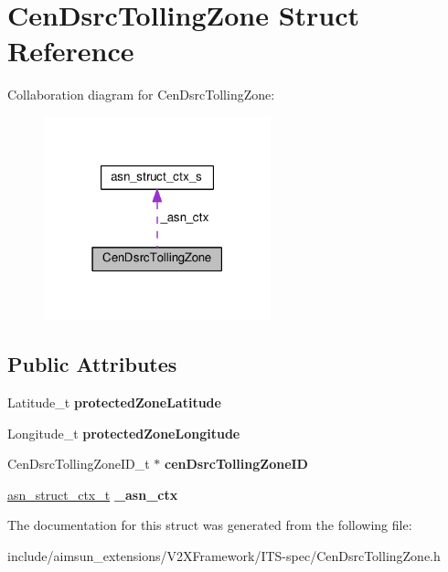 \hypertarget{structCenDsrcTollingZone}{}\section{Cen\+Dsrc\+Tolling\+Zone Struct Reference}
\label{structCenDsrcTollingZone}


Collaboration diagram for Cen\+Dsrc\+Tolling\+Zone\+:\nopagebreak
\begin{figure}[H]
\begin{center}
\leavevmode
\includegraphics[width=186pt]{structCenDsrcTollingZone__coll__graph}
\end{center}
\end{figure}
\subsection*{Public Attributes}
\begin{DoxyCompactItemize}
\item 
Latitude\+\_\+t {\bfseries protected\+Zone\+Latitude}\hypertarget{structCenDsrcTollingZone_a0bbfcfeee86f98b0485a98e4c8044a89}{}\label{structCenDsrcTollingZone_a0bbfcfeee86f98b0485a98e4c8044a89}

\item 
Longitude\+\_\+t {\bfseries protected\+Zone\+Longitude}\hypertarget{structCenDsrcTollingZone_ac6fe8cc4ab012ede258f3528732ed5e2}{}\label{structCenDsrcTollingZone_ac6fe8cc4ab012ede258f3528732ed5e2}

\item 
Cen\+Dsrc\+Tolling\+Zone\+I\+D\+\_\+t $\ast$ {\bfseries cen\+Dsrc\+Tolling\+Zone\+ID}\hypertarget{structCenDsrcTollingZone_ac5b03cb1e61cb3551e8f5f6d8e516b26}{}\label{structCenDsrcTollingZone_ac5b03cb1e61cb3551e8f5f6d8e516b26}

\item 
\hyperlink{structasn__struct__ctx__s}{asn\+\_\+struct\+\_\+ctx\+\_\+t} {\bfseries \+\_\+asn\+\_\+ctx}\hypertarget{structCenDsrcTollingZone_a6f310891ae7b864d625c09a08f301d6d}{}\label{structCenDsrcTollingZone_a6f310891ae7b864d625c09a08f301d6d}

\end{DoxyCompactItemize}


The documentation for this struct was generated from the following file\+:\begin{DoxyCompactItemize}
\item 
include/aimsun\+\_\+extensions/\+V2\+X\+Framework/\+I\+T\+S-\/spec/Cen\+Dsrc\+Tolling\+Zone.\+h\end{DoxyCompactItemize}

